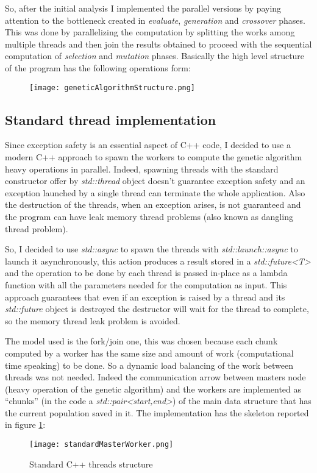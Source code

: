 So, after the initial analysis I implemented the parallel versions by paying attention to the bottleneck created in \textit{evaluate}, \textit{generation} and \textit{crossover} phases. This was done by parallelizing the computation by splitting the works among multiple threads and then join the results obtained to proceed with the sequential computation of \textit{selection} and \textit{mutation} phases. Basically the high level structure of the program has the following operations form: 
\begin{figure}[H]
	\centering
	\texttt{[image: geneticAlgorithmStructure.png]}
\end{figure}
 
\subsection{Standard thread implementation}
Since exception safety is an essential aspect of C++ code, I decided to use a modern C++ approach to spawn the workers to compute the genetic algorithm heavy operations in parallel. Indeed, spawning threads with the standard constructor offer by \textit{std::thread} object doesn't guarantee exception safety and an exception launched by a single thread can terminate the whole application. Also the destruction of the threads, when an exception arises, is not guaranteed and the program can have leak memory thread problems (also known as dangling thread problem).

So, I decided to use \textit{std::async} to spawn the threads with \textit{std::launch::async} to launch it asynchronously, this action produces a result stored in a \textit{std::future<T>} and the operation to be done by each thread is passed in-place as a lambda function with all the parameters needed for the computation as input. This approach guarantees that even if an exception is raised by a thread and its \textit{std::future} object is destroyed the destructor will wait for the thread to complete, so the memory thread leak problem is avoided. 

The model used is the fork/join one, this was chosen because each chunk computed by a worker has the same size and amount of work (computational time speaking) to be done. So a dynamic load balancing of the work between threads was not needed. Indeed the communication arrow between masters node (heavy operation of the genetic algorithm) and the workers are implemented as ``chunks'' (in the code a \textit{std::pair<start,end>}) of the main data structure that has the current population saved in it. The implementation has the skeleton reported in figure \ref{fig:standardStructure}: 
\vspace{1.5em}
\begin{figure}[h]
	\centering
	\texttt{[image: standardMasterWorker.png]}
	\vspace{0.15em}
	\caption{Standard C++ threads structure}
	\label{fig:standardStructure}
\end{figure}
\vspace{1em}

